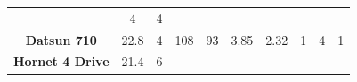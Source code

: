 \documentclass[]{article}
\begin{document}
\begin{longtable}[c]{@{}cccccccccc@{}}
\begin{minipage}[t]{0.05\columnwidth}
\strut\end{minipage} &
\begin{minipage}[t]{0.06\columnwidth}\centering\strut
4
\strut\end{minipage} &
\begin{minipage}[t]{0.06\columnwidth}\centering\strut
4
\strut\end{minipage}\tabularnewline
\begin{minipage}[t]{0.22\columnwidth}\centering\strut
\textbf{Datsun 710}
\strut\end{minipage} &
\begin{minipage}[t]{0.06\columnwidth}\centering\strut
22.8
\strut\end{minipage} &
\begin{minipage}[t]{0.06\columnwidth}\centering\strut
4
\strut\end{minipage} &
\begin{minipage}[t]{0.06\columnwidth}\centering\strut
108
\strut\end{minipage} &
\begin{minipage}[t]{0.05\columnwidth}\centering\strut
93
\strut\end{minipage} &
\begin{minipage}[t]{0.06\columnwidth}\centering\strut
3.85
\strut\end{minipage} &
\begin{minipage}[t]{0.06\columnwidth}\centering\strut
2.32
\strut\end{minipage} &
\begin{minipage}[t]{0.05\columnwidth}\centering\strut
1
\strut\end{minipage} &
\begin{minipage}[t]{0.06\columnwidth}\centering\strut
4
\strut\end{minipage} &
\begin{minipage}[t]{0.06\columnwidth}\centering\strut
1
\strut\end{minipage}\tabularnewline
\begin{minipage}[t]{0.22\columnwidth}\centering\strut
\textbf{Hornet 4 Drive}
\strut\end{minipage} &
\begin{minipage}[t]{0.06\columnwidth}\centering\strut
21.4
\strut\end{minipage} &
\begin{minipage}[t]{0.06\columnwidth}\centering\strut
6
\strut\end{minipage} &
\begin{minipage}[t]{0.06\columnwidth}\centering\strut

\end{minipage}
\end{longtable}
\end{document}
